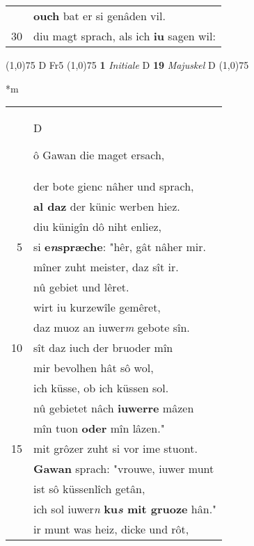 \documentclass[8pt,a4paper,notitlepage]{article}
\begin{document}
\begin{table}[ht]
\begin{minipage}[t]{0.5\linewidth}
\begin{tabular}{rl}
 & \textbf{ouch} bat er si genâden vil.\\ 
30 & diu magt sprach, als ich \textbf{iu} sagen wil:\\ 
\end{tabular}
\scriptsize
\line(1,0){75} \newline
D Fr5 \newline
\line(1,0){75} \newline
\textbf{1} \textit{Initiale} D  \textbf{19} \textit{Majuskel} D  \newline
\line(1,0){75} \newline
\newline
\end{minipage}
\hspace{0.5cm}
\begin{minipage}[t]{0.5\linewidth}
\small
\begin{center}*m
\end{center}
\begin{tabular}{rl}
 & \begin{large}D\end{large}ô Gawan die maget ersach,\\ 
 & der bote gienc nâher und sprach,\\ 
 & \textbf{al daz} der künic werben hiez.\\ 
 & diu künigîn dô niht enliez,\\ 
5 & si \textbf{e\textit{n}spræche}: "hêr, gât nâher mir.\\ 
 & mîner zuht meister, daz sît ir.\\ 
 & nû gebiet und lêret.\\ 
 & wirt iu kurzewîle gemêret,\\ 
 & daz muoz an iuwer\textit{m} gebote sîn.\\ 
10 & sît daz iuch der bruoder mîn\\ 
 & mir bevolhen hât sô wol,\\ 
 & ich küsse, ob ich küssen sol.\\ 
 & nû gebietet nâch \textbf{iuwerre} mâzen\\ 
 & mîn tuon \textbf{oder} mîn lâzen."\\ 
15 & mit grôzer zuht si vor ime stuont.\\ 
 & \textbf{Gawan} sprach: "vrouwe, iuwer munt\\ 
 & ist sô küssenlîch getân,\\ 
 & ich sol iuwer\textit{n} \textbf{ku\textit{s} mit gruoze} hân."\\ 
 & ir munt was heiz, dicke und rôt,\\ 

\end{tabular}
\end{minipage}
\end{table}
\end{document}
